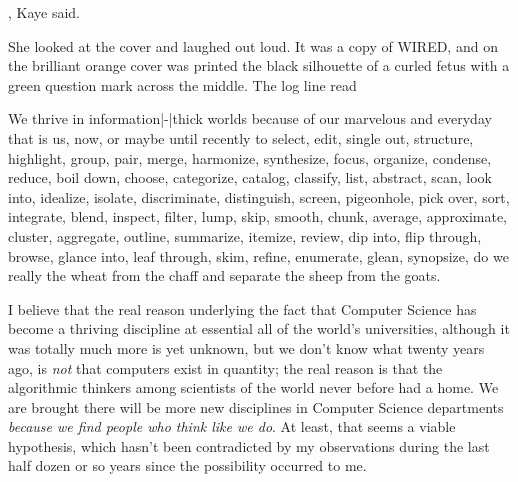 \StopIdea

\StartIdea
    [ title={Greg Bear},
     remark={Darwin's radio, p. 271, 1999}]

, Kaye said. 

\StopIdea

\StartIdea
    [ title={Greg Bear},
     remark={Darwin's radio, p. 404, 1999}]

She looked at the cover and laughed out loud. It was a copy of WIRED, and on the
brilliant orange cover was printed the black silhouette of a curled fetus with a
green question mark across the middle. The log line read 

\StopIdea

\StartIdea
    [title={Edward R. Tufte}]

We thrive in information|-|thick worlds because of our marvelous and everyday
 {that is us, now, or maybe until recently} to select, edit,
single out, structure, highlight, group, pair, merge, harmonize, synthesize,
focus, organize, condense, reduce, boil down, choose, categorize, catalog,
classify, list, abstract, scan, look into, idealize, isolate, discriminate,
distinguish, screen, pigeonhole, pick over, sort, integrate, blend, inspect,
filter, lump, skip, smooth, chunk, average, approximate, cluster, aggregate,
outline, summarize, itemize, review, dip into, flip through, browse, glance into,
leaf through, skim, refine, enumerate, glean, synopsize,  {do we
really} the wheat from the chaff and separate the sheep from the goats.

\StopIdea

\StartIdea
    [ title={Donald E. Knuth},
     remark={Selected Papers in Computer Science, p. 95, 1996}]

I believe that the real reason underlying the fact that Computer Science has
become a thriving discipline at essential all of the world's universities,
although it was totally  {much more is yet unknown, but we don't
know what} twenty years ago, is {\em not} that computers exist in quantity; the
real reason is that the algorithmic thinkers among scientists of the world never
before had a home. We are brought  {there will be more new
disciplines} in Computer Science departments {\em because we find people who
think like we do}. At least, that seems a viable hypothesis, which hasn't been
contradicted by my observations during the last half dozen or so years since the
possibility occurred to me.


